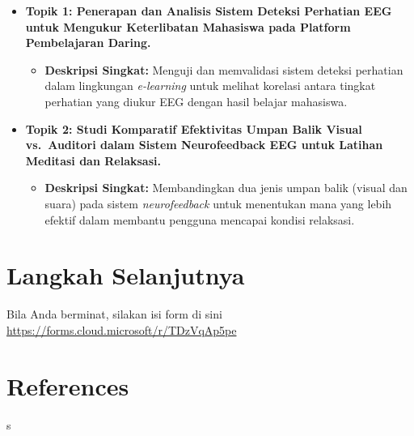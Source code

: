 \documentclass[
  letterpaper,
  DIV=11,
  numbers=noendperiod]{scrreprt}
\providecommand{\tightlist}{%
  \setlength{\itemsep}{0pt}\setlength{\parskip}{0pt}}
\begin{document}
\begin{itemize}
\tightlist
\item
  \textbf{Topik 1: Penerapan dan Analisis Sistem Deteksi Perhatian EEG
  untuk Mengukur Keterlibatan Mahasiswa pada Platform Pembelajaran
  Daring.}

  \begin{itemize}
  \tightlist
  \item
    \textbf{Deskripsi Singkat:} Menguji dan memvalidasi sistem deteksi
    perhatian dalam lingkungan \emph{e-learning} untuk melihat korelasi
    antara tingkat perhatian yang diukur EEG dengan hasil belajar
    mahasiswa.
  \end{itemize}
\item
  \textbf{Topik 2: Studi Komparatif Efektivitas Umpan Balik Visual
  vs.~Auditori dalam Sistem Neurofeedback EEG untuk Latihan Meditasi dan
  Relaksasi.}

  \begin{itemize}
  \tightlist
  \item
    \textbf{Deskripsi Singkat:} Membandingkan dua jenis umpan balik
    (visual dan suara) pada sistem \emph{neurofeedback} untuk menentukan
    mana yang lebih efektif dalam membantu pengguna mencapai kondisi
    relaksasi.
  \end{itemize}
\end{itemize}


\chapter{Langkah Selanjutnya}\label{langkah-selanjutnya}

Bila Anda berminat, silakan isi form di sini
\url{https://forms.cloud.microsoft/r/TDzVqAp5pe}


\chapter*{References}\label{references}


s
\end{document}
